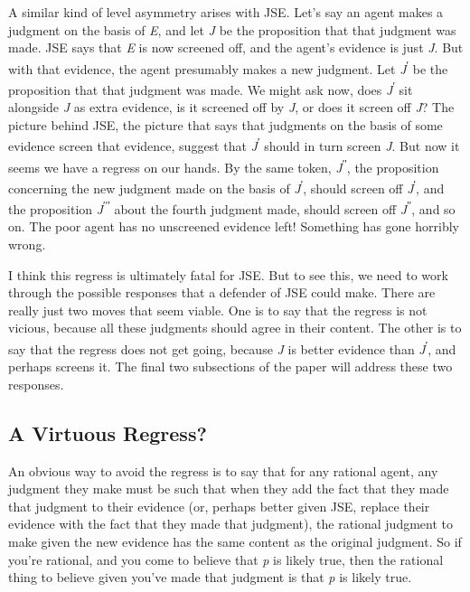 \documentclass[
  11pt,
  letterpaper,
  DIV=11,
  numbers=noendperiod,
  twoside]{scrartcl}
\begin{document}
A similar kind of level asymmetry arises with JSE. Let's say an agent
makes a judgment on the basis of \emph{E}, and let \emph{J} be the
proposition that that judgment was made. JSE says that \emph{E} is now
screened off, and the agent's evidence is just \emph{J}. But with that
evidence, the agent presumably makes a new judgment. Let
\emph{J}\textsuperscript{ʹ} be the proposition that that judgment was
made. We might ask now, does \emph{J}\textsuperscript{ʹ} sit alongside
\emph{J} as extra evidence, is it screened off by \emph{J}, or does it
screen off \emph{J}? The picture behind JSE, the picture that says that
judgments on the basis of some evidence screen that evidence, suggest
that \emph{J}\textsuperscript{ʹ} should in turn screen \emph{J}. But now
it seems we have a regress on our hands. By the same token,
\emph{J}\textsuperscript{ʹʹ}, the proposition concerning the new
judgment made on the basis of \emph{J}\textsuperscript{ʹ}, should screen
off \emph{J}\textsuperscript{ʹ}, and the proposition
\emph{J}\textsuperscript{ʹʹʹ} about the fourth judgment made, should
screen off \emph{J}\textsuperscript{ʹʹ}, and so on. The poor agent has
no unscreened evidence left! Something has gone horribly wrong.

I think this regress is ultimately fatal for JSE. But to see this, we
need to work through the possible responses that a defender of JSE could
make. There are really just two moves that seem viable. One is to say
that the regress is not vicious, because all these judgments should
agree in their content. The other is to say that the regress does not
get going, because \emph{J} is better evidence than
\emph{J}\textsuperscript{ʹ}, and perhaps screens it. The final two
subsections of the paper will address these two responses.

\subsection{A Virtuous Regress?}\label{a-virtuous-regress}

An obvious way to avoid the regress is to say that for any rational
agent, any judgment they make must be such that when they add the fact
that they made that judgment to their evidence (or, perhaps better given
JSE, replace their evidence with the fact that they made that judgment),
the rational judgment to make given the new evidence has the same
content as the original judgment. So if you're rational, and you come to
believe that \emph{p} is likely true, then the rational thing to believe
given you've made that judgment is that \emph{p} is likely true.
\end{document}
